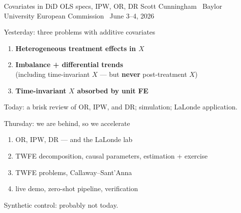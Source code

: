 \documentclass[aspectratio=169,11pt]{beamer}
\begin{document}
\codechellatitle
  {Covariates in DiD}
  {OLS specs, IPW, OR, DR}
  {Scott Cunningham \textperiodcentered\ Baylor University}
  {European Commission \textperiodcentered\ June 3--4, 2026}

\begin{frame}{Yesterday: three problems with additive covariates}
\vspace{0.4em}
\begin{enumerate}\setlength\itemsep{0.5em}
  \item \textbf{Heterogeneous treatment effects in $X$} \hfill {}
  \item \textbf{Imbalance + differential trends} \hfill {}\\
        {\small\color{warmgray}(including time-invariant $X$ --- but \textbf{never} post-treatment $X$)}
  \item \textbf{Time-invariant $X$ absorbed by unit FE} \hfill {}
\end{enumerate}
\vspace{0.5em}
\begin{center}\color{warmgray}\small
Today: a brisk review of OR, IPW, and DR; simulation; LaLonde application.
\end{center}
\end{frame}

\begin{frame}{Thursday: we are behind, so we accelerate}
\vspace{0.5em}
\begin{enumerate}\setlength\itemsep{0.5em}
  \item {} OR, IPW, DR --- and the LaLonde lab
  \item {} TWFE decomposition, causal parameters, estimation + exercise
  \item {} TWFE problems, Callaway--Sant'Anna
  \item {} live demo, zero-shot pipeline, verification
\end{enumerate}
\vspace{0.5em}
\begin{center}\color{warmgray}\small
Synthetic control: probably not today.
\end{center}
\end{frame}
\end{document}

